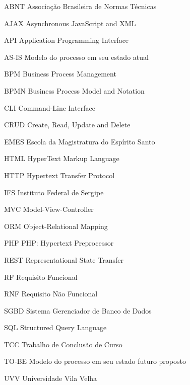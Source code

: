 %
%
%

\begin{siglas}

\item[ABNT] Associação Brasileira de Normas Técnicas
\item[AJAX] Asynchronous JavaScript and XML
\item[API] Application Programming Interface
\item[AS-IS] Modelo do processo em seu estado atual
\item[BPM] Business Process Management
\item[BPMN] Business Process Model and Notation
\item[CLI] Command-Line Interface
\item[CRUD] Create, Read, Update and Delete
\item[EMES] Escola da Magistratura do Espírito Santo
\item[HTML] HyperText Markup Language
\item[HTTP] Hypertext Transfer Protocol
\item[IFS] Instituto Federal de Sergipe
\item[MVC] Model-View-Controller
\item[ORM] Object-Relational Mapping
\item[PHP] PHP: Hypertext Preprocessor
\item[REST] Representational State Transfer
\item[RF] Requisito Funcional
\item[RNF] Requisito Não Funcional
\item[SGBD] Sistema Gerenciador de Banco de Dados
\item[SQL] Structured Query Language
\item[TCC] Trabalho de Conclusão de Curso
\item[TO-BE] Modelo do processo em seu estado futuro proposto
\item[UVV] Universidade Vila Velha

\end{siglas}
